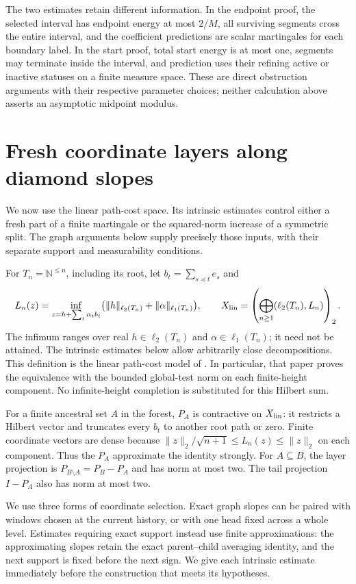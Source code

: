 The two estimates retain different information.  In the endpoint proof,
the selected interval has endpoint energy at most $2/M$, all surviving
segments cross the entire interval, and the coefficient predictions are
scalar martingales for each boundary label.  In the start proof, total
start energy is at most one, segments may terminate inside the interval,
and prediction uses their refining active or inactive statuses on a
finite measure space.  These are direct obstruction arguments with
their respective parameter choices; neither calculation above asserts
an asymptotic midpoint modulus.

\section{Fresh coordinate layers along diamond slopes}\label{dir:layers}

We now use the linear path-cost space.  Its intrinsic estimates control
either a fresh part of a finite martingale or the squared-norm increase
of a symmetric split.  The graph arguments below supply precisely those
inputs, with their separate support and measurability conditions.

For $T_n=\mathbb N^{\le n}$, including its root, let
$b_t=\sum_{s\preceq t}e_s$ and
\[
 L_n(z)=\inf_{z=h+\sum_t\alpha_tb_t}
          \bigl(\|h\|_{\ell_2(T_n)}+\|\alpha\|_{\ell_1(T_n)}\bigr),
 \qquad
 X_{\rm lin}=\left(\bigoplus_{n\ge1}(\ell_2(T_n),L_n)\right)_2.
\]
The infimum ranges over real $h\in\ell_2(T_n)$ and
$\alpha\in\ell_1(T_n)$; it need not be attained.  The intrinsic estimates
below allow arbitrarily close decompositions.  This definition is the
linear path-cost model of
\cite[Propositions~5.1 and~5.2]{TreePotentials}.  In particular, that
paper proves the equivalence with the bounded global-test norm on each
finite-height component.  No infinite-height completion is substituted
for this Hilbert sum.

For a finite ancestral set $A$ in the forest, $P_A$ is contractive on
$X_{\rm lin}$: it restricts a Hilbert vector and truncates every $b_t$ to another
root path or zero.  Finite coordinate vectors are dense because
$\|z\|_2/\sqrt{n+1}\le L_n(z)\le\|z\|_2$ on each component.
Thus the $P_A$ approximate the identity strongly.  For $A\subseteq B$,
the layer projection is $P_{B\setminus A}=P_B-P_A$ and has norm at most
two.  The tail projection $I-P_A$ also has norm at most two.

We use three forms of coordinate selection. Exact graph slopes can be
paired with windows chosen at the current history, or with one head
fixed across a whole level. Estimates requiring exact support instead
use finite approximations: the approximating slopes retain the exact
parent--child averaging identity, and the next support is fixed before
the next sign. We give each intrinsic estimate immediately before the
construction that meets its hypotheses.

